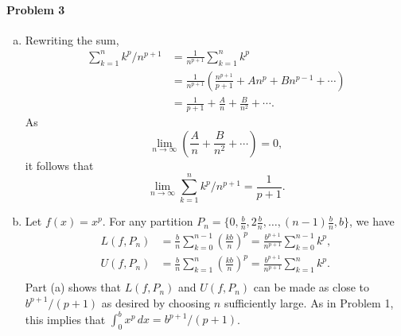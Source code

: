 \documentclass{article}
\begin{document}
\paragraph{Problem 3}
\begin{enumerate}[(a)]
  \item Rewriting the sum,
    \begin{align*}
      \sum_{k=1}^n k^p/n^{p+1}
      &= \frac{1}{n^{p+1}} \sum_{k=1}^n k^p \\
      &= \frac{1}{n^{p+1}} \left(
        \frac{n^{p+1}}{p+1} + An^p + Bn^{p-1} + \cdots
      \right) \\
      &= \frac{1}{p+1} + \frac{A}{n} + \frac{B}{n^2} + \cdots.
    \end{align*}
    As \[
      \lim_{n \to \infty} \left(
        \frac{A}{n} + \frac{B}{n^2} + \cdots
      \right) = 0,
    \] it follows that \[
      \lim_{n \to \infty} \sum_{k=1}^n k^p/n^{p+1} = \frac{1}{p+1}.
    \]
  \item Let $f(x) = x^p$. For any partition $P_n = \{0, \frac{b}{n},
    2\frac{b}{n}, \ldots, (n - 1)\frac{b}{n}, b\}$, we have
    \begin{align*}
      L(f, P_n)
      &= \frac{b}{n} \sum_{k=0}^{n-1} \left( \frac{kb}{n} \right)^p
      = \frac{b^{p+1}}{n^{p+1}} \sum_{k=0}^{n-1}k^p, \\
      U(f, P_n)
      &= \frac{b}{n} \sum_{k=1}^n \left( \frac{kb}{n} \right)^p
      = \frac{b^{p+1}}{n^{p+1}} \sum_{k=1}^n k^p. \\
    \end{align*}
    Part (a) shows that $L(f, P_n)$ and $U(f, P_n)$ can be made as close to
    $b^{p+1}/(p+1)$ as desired by choosing $n$ sufficiently large. As in
    Problem 1, this implies that $\int_0^b x^p \,dx = b^{p + 1}/(p + 1)$.
\end{enumerate}
\end{document}
